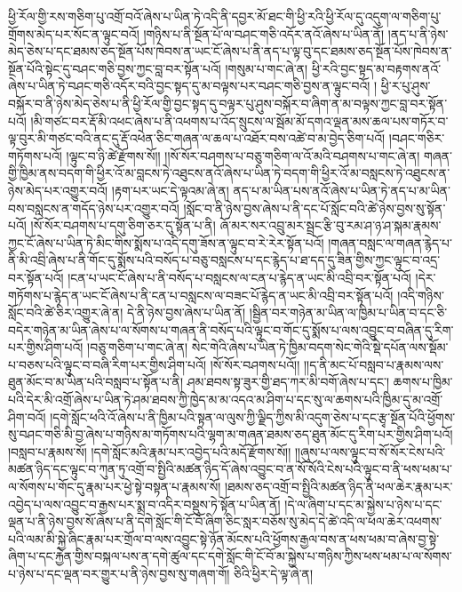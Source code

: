 ཕྱི་རོལ་གྱི་རས་གཅིག་པུ་འགྲོ་བའོ་ཞེས་པ་ཡིན་ཏེ་འདི་ནི་དབྱར་མོ་ཐང་གི་ཕྱི་རའི་ཕྱི་རོལ་དུ་འདུག་ལ་གཅིག་པུ་གྲོགས་མེད་པར་སོང་ན་ལྟུང་བའོ། །གཉིས་པ་ནི་སྔོན་པོ་ལ་བཤང་གཅི་འདོར་ནའོ་ཞེས་པ་ཡིན་ནོ། །ནད་པ་ནི་ཉེས་མེད་ཅེས་པ་དང་ཐམས་ཅད་སྔོན་པོས་ཁེབས་ན་ཡང་ངོ་ཞེས་པ་ནི་ནད་པ་ལྟ་བུ་དང་ཐམས་ཅད་སྔོན་པོས་ཁེབས་ན་སྔོན་པོའི་སྟེང་དུ་བཤང་གཅི་བྱས་ཀྱང་བླ་བར་སྟོན་པའོ། །གསུམ་པ་གང་ཞེ་ན། ཕྱི་རའི་བྱང་སྟད་མ་བརྟགས་ནའོ་ཞེས་པ་ཡིན་ཏེ་བཤང་གཅི་འདོར་བའི་བྱང་སྟད་དུ་མ་བལྟས་པར་བཤང་གཅི་བྱས་ན་ལྟུང་བའོ། །
ཕྱི་ར་པུ་ཤུས་བསྐོར་བ་ནི་ཉེས་མེད་ཅེས་པ་ནི་ཕྱི་རོལ་གྱི་བྱང་སྟད་དུ་བལྟར་པུ་ཤུས་བསྐོར་བ་ཞིག་ན་མ་བལྟས་ཀྱང་བླ་བར་སྟོན་པའོ། །མི་གཙང་བར་རྡོ་མི་འཕང་ཞེས་པ་ནི་འཕགས་པ་འོད་སྲུངས་ལ་སྦོམ་མོ་དགའ་ལྡན་མས་ཆལ་པས་གཏོར་བ་ལྟ་བུར་མི་གཙང་བའི་ནང་དུ་རྡོ་འཕེན་ཅིང་གཞན་ལ་ཆལ་པ་འཐོར་བས་འཚེ་བ་མ་བྱེད་ཅིག་པའོ། །བཤང་གཅིར་གཏོགས་པའོ། །ལྟུང་བ་ཉི་ཚེ་རྫོགས་སོ།། །།སོ་སོར་བཤགས་པ་བཅུ་གཅིག་ལ་འོ་མའི་བཤགས་པ་གང་ཞེ་ན། གཞན་གྱི་ཁྱིམ་ནས་བདག་གི་ཕྱིར་འོ་མ་བླངས་ཏེ་འཐུངས་ནའོ་ཞེས་པ་ཡིན་ཏེ་བདག་གི་ཕྱིར་འོ་མ་བསླངས་ཏེ་འཐུངས་ན་ཉེས་མེད་པར་འགྱུར་བའོ། །རྟག་པར་ཡང་དེ་ལྟའམ་ཞེ་ན། ནད་པ་མ་ཡིན་པས་ནའོ་ཞེས་པ་ཡིན་ཏེ་ནད་པ་མ་ཡིན་བས་བསླངས་ན་གདོད་ཉེས་པར་འགྱུར་བའོ། །སློང་བ་ནི་ཉེས་བྱས་ཞེས་པ་ནི་དང་པོ་སློང་བའི་ཚེ་ཉེས་བྱས་སུ་སྟོན་པའོ། །སོ་སོར་བཤགས་པ་དགུ་ཅིག་ཅར་དུ་སྟོན་པ་ནི། ཞོ་མར་སར་འབྲུ་མར་སྦྲང་རྩི་བུ་རམ་ཤ་ཉ་ཤ་སྐམ་རྣམས་ཀྱང་ངོ་ཞེས་པ་ཡིན་ཏེ་མིང་གིས་སྨོས་པ་འདི་དགུ་ཟོས་ན་ལྟུང་བ་རེ་རེར་སྟོན་པའོ། །གཞན་བསླང་ལ་གཞན་རྙེད་པ་ནི་མི་འབྲི་ཞེས་པ་ནི་གོང་དུ་སྨོས་པའི་བསོད་པ་བཅུ་བསླངས་པ་དང་རྙེད་པ་ཐ་དད་དུ་ཟིན་གྱིས་ཀྱང་ལྟུང་བ་འདྲ་བར་སྟོན་པའོ། །ངན་པ་ཡང་ངོ་ཞེས་པ་ནི་བསོད་པ་བསླངས་ལ་ངན་པ་རྙེད་ན་ཡང་མི་འབྲི་བར་སྟོན་པའོ། །དེར་གཏོགས་པ་རྙེད་ན་ཡང་ངོ་ཞེས་པ་ནི་ངན་པ་བསླངས་ལ་བཟང་པོ་རྙེད་ན་ཡང་མི་འབྲི་བར་སྟོན་པའོ། །འདི་གཉིས་སློང་བའི་ཚེ་ཅིར་འགྱུར་ཞེ་ན། དེ་ནི་ཉེས་བྱས་ཞེས་པ་ཡིན་ནོ། །སྦྱིན་བར་གཉེན་མ་ཡིན་ལ་ཁྱིམ་པ་ཡིན་བ་དང་ཅི་བདེར་གཉེན་མ་ཡིན་ཞེས་པ་ལ་སོགས་པ་གཞན་ནི་བསོད་པའི་ལྟུང་བ་གོང་དུ་སྨོས་པ་ལས་འབྱུང་བ་བཞིན་དུ་རིག་པར་གྱིས་ཤིག་པའོ། །བཅུ་གཅིག་པ་གང་ཞེ་ན། སེང་གེའི་ཞེས་པ་ཡིན་ཏེ་ཁྱིམ་བདག་སེང་གེའི་སྡེ་དཔོན་ལས་སྡོམ་པ་བཅས་པའི་ལྟུང་བ་བཞི་རིག་པར་གྱིས་ཤིག་པའོ། །སོ་སོར་བཤགས་པའོ།། །།ད་ནི་མང་པོ་བསླབ་པ་རྣམས་ལས་ཐུན་མོང་བ་མ་ཡིན་པའི་བསླབ་པ་སྟོན་པ་ནི། ཤམ་ཐབས་སྟ་ཟུར་གྱི་ཐད་ཀར་མི་བགོ་ཞེས་པ་དང་། ཆགས་པ་ཁྱིམ་པའི་དེར་མི་འགྲོ་ཞེས་པ་ཡིན་ཏེ་ཤམ་ཐབས་ཀྱི་ཁྱེད་མ་མ་འདའ་མ་ཤིག་པ་དང་སུ་ལ་ཆགས་པའི་ཁྱིམ་དུ་མ་འགྲོ་ཤིག་བའོ། །དགེ་སློང་ཕའི་འོ་ཞེས་པ་ནི་ཁྱིམ་པའི་སྟན་ལ་ལུས་ཀྱི་ལྗིད་ཀྱིས་མི་འདུག་ཅེས་པ་དང་རྩྭ་སྔོན་པོའི་ཕྱོགས་སུ་བཤང་གཅི་མི་བྱ་ཞེས་པ་གཉིས་མ་གཏོགས་པའི་ལྷག་མ་གཞན་ཐམས་ཅད་ཐུན་མོང་དུ་རིག་པར་གྱིས་ཤིག་པའོ། །བསླབ་པ་རྣམས་སོ། །དགེ་སློང་མའི་རྣམ་པར་འབྱེད་པའི་མདོ་རྫོགས་སོ།། །།ཞུས་པ་ལས་ལྟུང་བ་སོ་སོར་ངེས་པའི་མཚན་ཉིད་དང་ལྟུང་བ་ཀུན་ཏུ་འགྲོ་བ་སྤྱིའི་མཚན་ཉིད་དོ་ཞེས་འབྱུང་བ་ན་སོ་སོའི་ངེས་པའི་ལྟུང་བ་ནི་ཕས་ཕམ་པ་ལ་སོགས་པ་གོང་དུ་རྣམ་པར་ཕྱེ་སྟེ་བསྟན་པ་རྣམས་སོ། །ཐམས་ཅད་འགྲོ་བ་སྤྱིའི་མཚན་ཉིད་ནི་ཕལ་ཆེར་རྣམ་པར་འབྱེད་པ་ལས་འབྱུང་བ་རྒྱས་པར་སྨྲ་བ་འདིར་བསྡུས་ཏེ་སྟོན་པ་ཡིན་ནོ། །དེ་ལ་ཞིག་པ་དང་མ་སྐྱེས་པ་ཉེས་པ་དང་ལྡན་པ་ནི་ཉེས་བྱས་སོ་ཞེས་པ་ནི་དགེ་སློང་གི་ངོ་བོ་ཞིག་ཅིང་སླར་བཅོས་སུ་མེད་དེ་ཚེ་འདི་ལ་ཕལ་ཆེར་འཕགས་པའི་ལམ་མི་སྐྱེ་ཞིང་རྣམ་པར་གྲོལ་བ་ལས་འབྱུང་སྟེ་ཉོན་མོངས་པའི་ཕྱོགས་རྒྱལ་བས་ན་ཕས་ཕམ་བ་ཞེས་བྱ་སྟེ་ཞིག་པ་དང་རྐྱེན་གྱིས་བསྐལ་པས་ན་དགེ་ཚུལ་དང་དགེ་སློང་གི་ངོ་བོ་མ་སྐྱེས་པ་གཉིས་ཀྱིས་ཕས་ཕམ་པ་ལ་སོགས་པ་ཉེས་པ་དང་ལྡན་བར་གྱུར་པ་ནི་ཉེས་བྱས་སུ་གཞག་གོ། ཅིའི་ཕྱིར་དེ་ལྟ་ཞེ་ན། 